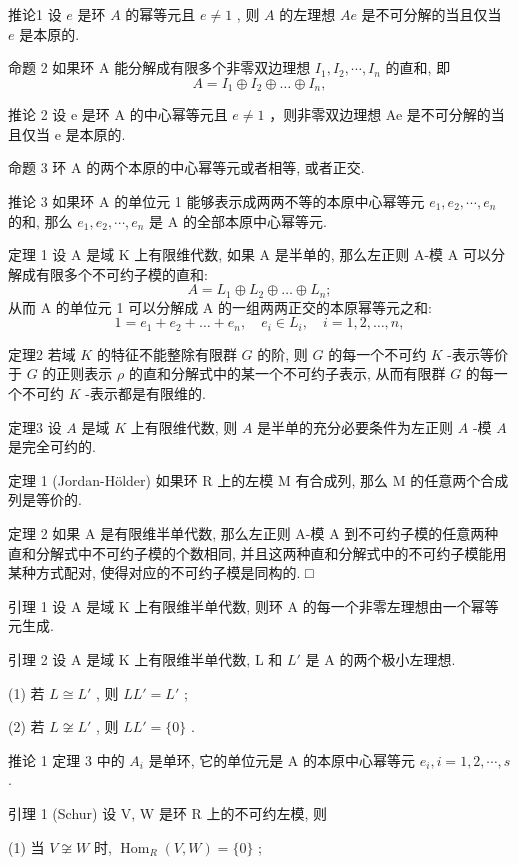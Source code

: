 \documentclass[]{article}
\begin{document}
推论1 设 $e$ 是环 $A$ 的幂等元且 $e \neq 1$ , 则 $A$ 的左理想 $Ae$ 是不可分解的当且仅当 $e$ 是本原的. 

命题 2 如果环 A 能分解成有限多个非零双边理想 $I_{1}, I_{2}, \cdots, I_{n}$ 的直和, 即$$
A = I _ {1} \oplus I _ {2} \oplus \dots \oplus I _ {n}, 
$$

推论 2 设 e 是环 A 的中心幂等元且 $e \neq 1$ ，则非零双边理想 Ae 是不可分解的当且仅当 e 是本原的. 

命题 3 环 A 的两个本原的中心幂等元或者相等, 或者正交. 

推论 3 如果环 A 的单位元 1 能够表示成两两不等的本原中心幂等元 $e_{1}, e_{2}, \cdots, e_{n}$ 的和, 那么 $e_{1}, e_{2}, \cdots, e_{n}$ 是 A 的全部本原中心幂等元. 

定理 1 设 A 是域 K 上有限维代数, 如果 A 是半单的, 那么左正则 A-模 A 可以分解成有限多个不可约子模的直和:$$
A = L _ {1} \oplus L _ {2} \oplus \dots \oplus L _ {n}; 
$$ 从而 A 的单位元 1 可以分解成 A 的一组两两正交的本原幂等元之和: $$
1 = e _ {1} + e _ {2} + \dots + e _ {n}, \quad e _ {i} \in L _ {i}, \quad i = 1, 2, \dots , n, 
$$   

定理2 若域 $K$ 的特征不能整除有限群 $G$ 的阶, 则 $G$ 的每一个不可约 $K$ -表示等价于 $G$ 的正则表示 $\rho$ 的直和分解式中的某一个不可约子表示, 从而有限群 $G$ 的每一个不可约 $K$ -表示都是有限维的. 


定理3 设 $A$ 是域 $K$ 上有限维代数, 则 $A$ 是半单的充分必要条件为左正则 $A$ -模 $A$ 是完全可约的. 

定理 1 (Jordan-Hölder) 如果环 R 上的左模 M 有合成列, 那么 M 的任意两个合成列是等价的. 

定理 2 如果 A 是有限维半单代数, 那么左正则 A-模 A 到不可约子模的任意两种直和分解式中不可约子模的个数相同, 并且这两种直和分解式中的不可约子模能用某种方式配对, 使得对应的不可约子模是同构的. □ 

引理 1 设 A 是域 K 上有限维半单代数, 则环 A 的每一个非零左理想由一个幂等元生成. 

引理 2 设 A 是域 K 上有限维半单代数, L 和 $L'$ 是 A 的两个极小左理想. 

(1) 若 $L \cong L'$ , 则 $LL' = L'$ ; 

(2) 若 $L \not\cong L'$ , 则 $LL' = \{0\}$ . 

推论 1 定理 3 中的 $A_{i}$ 是单环, 它的单位元是 A 的本原中心幂等元 $e_{i}, i = 1, 2, \cdots, s$ . 

引理 1 (Schur) 设 V, W 是环 R 上的不可约左模, 则 

(1) 当 $V \not\cong W$ 时, $\operatorname{Hom}_R(V, W) = \{0\}$ ; 
\end{document}
